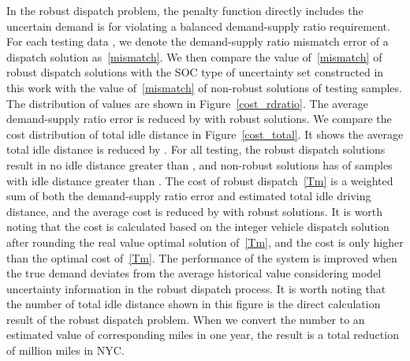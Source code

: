 \documentclass[10pt,twocolumn,twoside,english]{IEEEtran}
\begin{document}
In the robust dispatch problem, the penalty function directly includes the uncertain demand  is  for violating a balanced demand-supply ratio requirement. For each testing data , we denote the demand-supply ratio mismatch error of a dispatch solution as~\eqref{mismatch}. We then compare the value of~\eqref{mismatch} of robust dispatch solutions with the SOC type of uncertainty set constructed in this work with the value of~\eqref{mismatch} of non-robust solutions of testing samples. The distribution of values are shown in Figure~\ref{cost_rdratio}. The average demand-supply ratio error is reduced by  with robust solutions. We compare the cost distribution of total idle distance in Figure~\ref{cost_total}. It shows the average total idle distance is reduced by . For all testing, the robust dispatch solutions result in no idle distance greater than , and non-robust solutions has  of samples with idle distance greater than .  The cost of robust dispatch~\eqref{Tm} is a weighted sum of both the demand-supply ratio error and estimated total idle driving distance, and the average cost is reduced by  with robust solutions. It is worth noting that the cost is calculated based on the integer vehicle dispatch solution after rounding the real value optimal solution of~\eqref{Tm}, and the cost is only  higher than the optimal cost of~\eqref{Tm}. The performance of the system is improved when the true demand deviates from the average historical value considering model uncertainty information in the robust dispatch process. It is worth noting that the number of total idle distance shown in this figure is the direct calculation result of the robust dispatch problem. When we convert the number to an estimated value of corresponding miles in one year, the result is a total reduction of  million miles in NYC.
\end{document}

